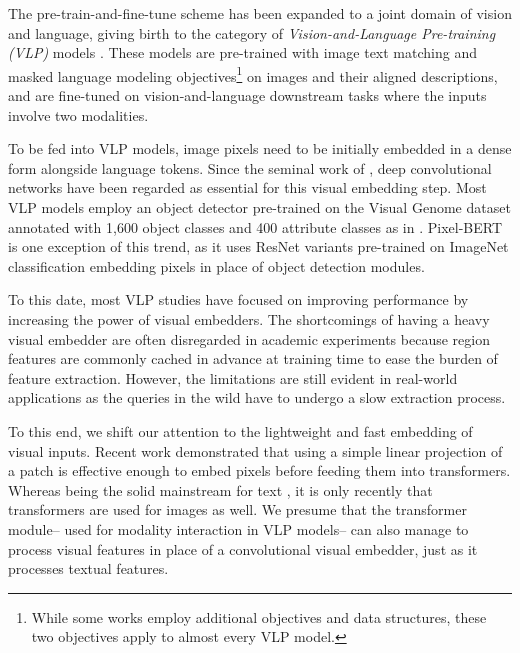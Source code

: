 \documentclass{article}
\begin{document}
The pre-train-and-fine-tune scheme has been expanded to a joint domain of vision and language, giving birth to the category of \textit{Vision-and-Language Pre-training (VLP)} models \citep{lu2019vilbert, chen2019uniter,su2019vl,li2019visualbert,tan2019lxmert,li2020unicoder,lu202012,cho2020x,qi2020imagebert,zhou2020unified,huang2020pixel,li2020oscar,gan2020large,yu2020ernie,zhang2021vinvl}.
These models are pre-trained with image text matching and masked language modeling objectives\footnote{While some works employ additional objectives and data structures, these two objectives apply to almost every VLP model.} on images and their aligned descriptions, and are fine-tuned on vision-and-language downstream tasks where the inputs involve two modalities. 

To be fed into VLP models, image pixels need to be initially embedded in a dense form alongside language tokens.
Since the seminal work of \citet{krizhevsky2012imagenet}, deep convolutional networks have been regarded as essential for this visual embedding step. 
Most VLP models employ an object detector pre-trained on the Visual Genome dataset \citep{krishna2017visual} annotated with 1,600 object classes and 400 attribute classes as in \citet{anderson2018bottom}.
Pixel-BERT \citep{huang2020pixel} is one exception of this trend, as it uses ResNet variants \citep{he2016deep, xie2017aggregated} pre-trained on ImageNet classification \citep{russakovsky2015imagenet} embedding pixels in place of object detection modules.

To this date, most VLP studies have focused on improving performance by increasing the power of visual embedders.
The shortcomings of having a heavy visual embedder are often disregarded in academic experiments because region features are commonly cached in advance at training time to ease the burden of feature extraction. However, the limitations are still evident in real-world applications as the queries in the wild have to undergo a slow extraction process.

To this end, we shift our attention to the lightweight and fast embedding of visual inputs.
Recent work \citep{dosovitskiy2020image, touvron2020training} demonstrated that using a simple linear projection of a patch is effective enough to embed pixels before feeding them into transformers.
Whereas being the solid mainstream for text \citep{devlin2019bert}, it is only recently that transformers \citep{vaswani2017attention} are used for images as well.
We presume that the transformer module-- used for modality interaction in VLP models-- can also manage to process visual features in place of a convolutional visual embedder, just as it processes textual features.
\end{document}
